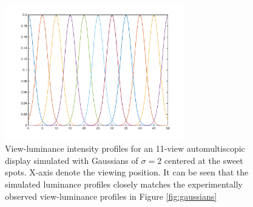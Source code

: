 \begin{figure}
\centering
    \includegraphics[width=0.7\textwidth]{./Template_Figures/sim_gaussians}
    \caption{View-luminance intensity profiles for an 11-view automultiscopic display simulated with Gaussians of $\sigma =2$ centered at the sweet spots. X-axis denote the viewing position. It can be seen that the simulated luminance profiles closely matches the experimentally observed view-luminance profiles in Figure \ref{fig:gaussians}\label{fig:sim_gaussians}}
\end{figure}

